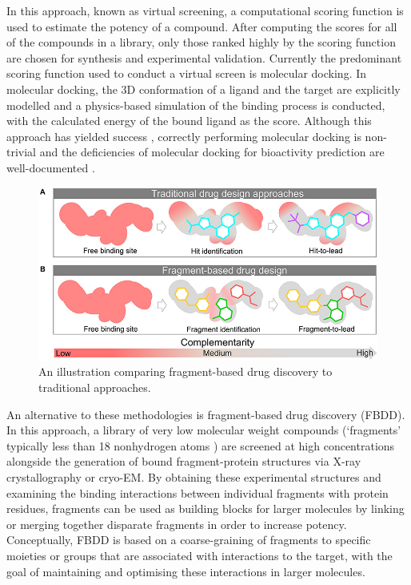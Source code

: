 In this approach, known as virtual screening, a computational scoring function is used to estimate the potency of a compound. After computing the scores for all of the compounds in a library, only those ranked highly by the scoring function are chosen for synthesis and experimental validation. Currently the predominant scoring function used to conduct a virtual screen is molecular docking. In molecular docking, the 3D conformation of a ligand and the target are explicitly modelled and a physics-based simulation of the binding process is conducted, with the calculated energy of the bound ligand as the score. Although this approach has yielded success \cite{Lyu2019UltraLargeDocking,Alon2021SigmaTwo}, correctly performing molecular docking is non-trivial and the deficiencies of molecular docking for bioactivity prediction are well-documented \cite{Llanos2021StrengthsAndWeaknesses, Macip2022HasteMakesWaste}.


\begin{figure}
    \centering
    \includegraphics[width=\linewidth]{Ch2/Figs/fbdd_vs_trad.jpg}
    \caption{An illustration comparing fragment-based drug discovery to traditional approaches.}
    \label{fig:fbdd}
\end{figure}

An alternative to these methodologies is fragment-based drug discovery (FBDD). In this approach, a library of very low molecular weight compounds (`fragments' typically less than 18 nonhydrogen atoms \cite{David2017FBLD}) are screened at high concentrations alongside the generation of bound fragment-protein structures via X-ray crystallography or cryo-EM. By obtaining these experimental structures and examining the binding interactions between individual fragments with protein residues, fragments can be used as building blocks for larger molecules by linking or merging together disparate fragments in order to increase potency. Conceptually, FBDD is based on a coarse-graining of fragments to specific moieties or groups that are associated with interactions to the target, with the goal of maintaining and optimising these interactions in larger molecules.

